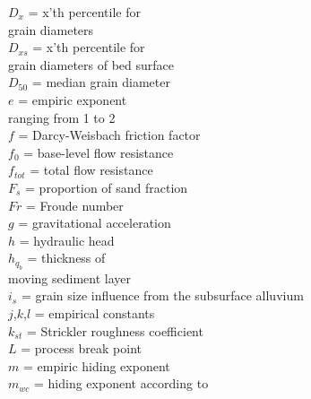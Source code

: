\documentclass[11pt,a4paper]{article}
\begin{document}
\begin{multicols}{2}
$D_x$ = x'th percentile for\\grain diameters \vspace{1.5ex} \\
$D_{xs}$ = x'th percentile for\\grain diameters of bed surface \vspace{1.5ex} \\
$D_{50}$ = median grain diameter \vspace{1.5ex} \\
$e$ = empiric exponent\\ranging from 1 to 2 \vspace{1.5ex} \\
$f$ = Darcy-Weisbach friction factor \vspace{1.5ex} \\
$f_0$ = base-level flow resistance \vspace{1.5ex} \\
$f_{tot}$ = total flow resistance \vspace{1.5ex} \\
$F_s$ = proportion of sand fraction \vspace{1.5ex} \\
$Fr$ = Froude number \vspace{1.5ex} \\
$g$ = gravitational acceleration \vspace{1.5ex} \\
$h$ = hydraulic head \vspace{1.5ex} \\
$h_{q_b}$ = thickness of\\moving sediment layer \vspace{1.5ex} \\
$i_s$ = grain size influence from the subsurface alluvium \vspace{1.5ex} \\
$j$,$k$,$l$ = empirical constants \vspace{1.5ex} \\
$k_{st}$ = Strickler roughness coefficient \vspace{1.5ex} \\
$L$ = process break point \vspace{1.5ex} \\
$m$ = empiric hiding exponent \vspace{1.5ex} \\
$m_{wc}$ = hiding exponent according to \citet{Wilcock+2003} \vspace{1.5ex} \\

\end{multicols}
\end{document}
